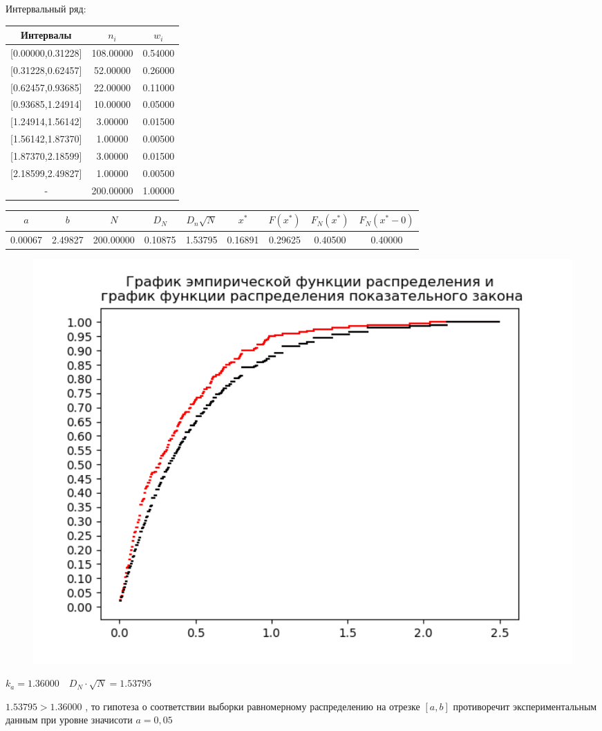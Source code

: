\newpage%
Интервальный ряд:\newline%
\newline%
%
\begin{tabular}{|c|c|c|}%
\hline%
Интервалы&$n_i$&$w_i$\\%
\hline%
{[}0.00000,0.31228{]}&108.00000&0.54000\\%
\hline%
{[}0.31228,0.62457{]}&52.00000&0.26000\\%
\hline%
{[}0.62457,0.93685{]}&22.00000&0.11000\\%
\hline%
{[}0.93685,1.24914{]}&10.00000&0.05000\\%
\hline%
{[}1.24914,1.56142{]}&3.00000&0.01500\\%
\hline%
{[}1.56142,1.87370{]}&1.00000&0.00500\\%
\hline%
{[}1.87370,2.18599{]}&3.00000&0.01500\\%
\hline%
{[}2.18599,2.49827{]}&1.00000&0.00500\\%
\hline%
{-}&200.00000&1.00000\\%
\hline%
\end{tabular}%
\newline%
\newline%
%
\newpage%
\begin{changemargin}{-4cm}{0cm}\small{%
\begin{tabular}{|c|c|c|c|c|c|c|c|c|}%
\hline%
$a$&$b$&$N$&$D_N$&$D_n \sqrt{N}$&$x^*$&$F(x^*)$&$F_N (x^*)$&$F_N (x^* - 0)$\\%
\hline%
0.00067&2.49827&200.00000&0.10875&1.53795&0.16891&0.29625&0.40500&0.40000\\%
\hline%
\end{tabular}%
\newline%
\newline%
%
}\end{changemargin}%


\begin{figure}%
\centering%
\includegraphics[width=1.0\textwidth]{../latex/inc/generated/img/EmpAndCurDistrFunc5.png}%
\end{figure}

%
$k_a=1.36000 \quad D_N \cdot \sqrt{N}=1.53795$

%
$1.53795 > 1.36000$%
, то гипотеза о соответствии выборки равномерному распределению на отрезке $[a,b]$ противоречит экспериментальным данным при уровне значисоти $a=0,05$